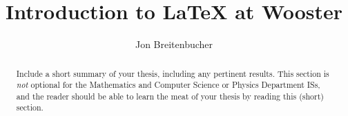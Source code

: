\documentclass[10pt,code,picins,kaukecopyright,openright,woolshort,dropcaps,verbatim,euler,index,colophon,blacklinks,twoside]{woosterthesis}
\title{Introduction to \LaTeX{} at Wooster}
\author{Jon Breitenbucher}
\begin{document}

\frontmatter
\maketitle
\ClearShipoutPicture
\clearpage\thispagestyle{empty}\null\clearpage
\disscopyright 

%                                                                                       
%                                                                                       

\begin{abstract}
Include a short summary of your thesis, including any pertinent results.  This section is \emph{not} optional for the Mathematics and Computer Science or Physics Department ISs, and the reader should be able to learn the meat of your thesis by reading this (short) section.
\end{abstract}

%                                                                                       
%                                                                                       

\dedication{This work is dedicated to the future generations of Wooster students.}


%                                                                                       
%                                                                                       
\end{document}
